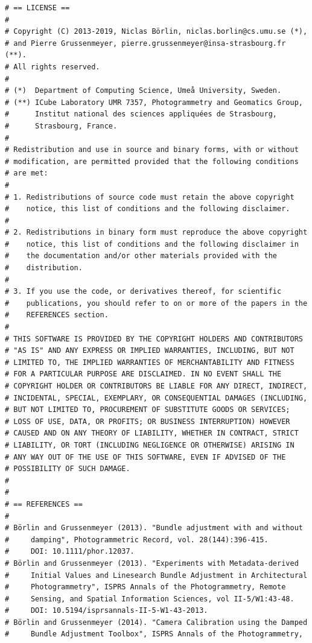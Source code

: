 \documentclass{article}
\begin{document}
\begin{verbatim}
# == LICENSE ==
#
# Copyright (C) 2013-2019, Niclas Börlin, niclas.borlin@cs.umu.se (*),
# and Pierre Grussenmeyer, pierre.grussenmeyer@insa-strasbourg.fr (**).
# All rights reserved.
#
# (*)  Department of Computing Science, Umeå University, Sweden. 
# (**) ICube Laboratory UMR 7357, Photogrammetry and Geomatics Group,
#      Institut national des sciences appliquées de Strasbourg,
#      Strasbourg, France.  
#
# Redistribution and use in source and binary forms, with or without
# modification, are permitted provided that the following conditions
# are met:
#
# 1. Redistributions of source code must retain the above copyright
#    notice, this list of conditions and the following disclaimer.
#
# 2. Redistributions in binary form must reproduce the above copyright
#    notice, this list of conditions and the following disclaimer in
#    the documentation and/or other materials provided with the
#    distribution.
#
# 3. If you use the code, or derivatives thereof, for scientific
#    publications, you should refer to on or more of the papers in the
#    REFERENCES section.
#
# THIS SOFTWARE IS PROVIDED BY THE COPYRIGHT HOLDERS AND CONTRIBUTORS
# "AS IS" AND ANY EXPRESS OR IMPLIED WARRANTIES, INCLUDING, BUT NOT
# LIMITED TO, THE IMPLIED WARRANTIES OF MERCHANTABILITY AND FITNESS
# FOR A PARTICULAR PURPOSE ARE DISCLAIMED. IN NO EVENT SHALL THE
# COPYRIGHT HOLDER OR CONTRIBUTORS BE LIABLE FOR ANY DIRECT, INDIRECT,
# INCIDENTAL, SPECIAL, EXEMPLARY, OR CONSEQUENTIAL DAMAGES (INCLUDING,
# BUT NOT LIMITED TO, PROCUREMENT OF SUBSTITUTE GOODS OR SERVICES;
# LOSS OF USE, DATA, OR PROFITS; OR BUSINESS INTERRUPTION) HOWEVER
# CAUSED AND ON ANY THEORY OF LIABILITY, WHETHER IN CONTRACT, STRICT
# LIABILITY, OR TORT (INCLUDING NEGLIGENCE OR OTHERWISE) ARISING IN
# ANY WAY OUT OF THE USE OF THIS SOFTWARE, EVEN IF ADVISED OF THE
# POSSIBILITY OF SUCH DAMAGE.
#
#
# == REFERENCES ==
#
# Börlin and Grussenmeyer (2013). "Bundle adjustment with and without
#     damping", Photogrammetric Record, vol. 28(144):396-415.
#     DOI: 10.1111/phor.12037.
# Börlin and Grussenmeyer (2013). "Experiments with Metadata-derived
#     Initial Values and Linesearch Bundle Adjustment in Architectural
#     Photogrammetry", ISPRS Annals of the Photogrammetry, Remote
#     Sensing, and Spatial Information Sciences, vol II-5/W1:43-48.
#     DOI: 10.5194/isprsannals-II-5-W1-43-2013.
# Börlin and Grussenmeyer (2014). "Camera Calibration using the Damped
#     Bundle Adjustment Toolbox", ISPRS Annals of the Photogrammetry,

\end{verbatim}
\end{document}
